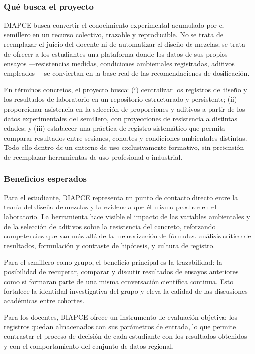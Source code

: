\subsubsection*{Qué busca el proyecto}

DIAPCE busca convertir el conocimiento experimental acumulado por el semillero en un recurso colectivo, trazable y reproducible. No se trata de reemplazar el juicio del docente ni de automatizar el diseño de mezclas; se trata de ofrecer a los estudiantes una plataforma donde los datos de sus propios ensayos ---resistencias medidas, condiciones ambientales registradas, aditivos empleados--- se conviertan en la base real de las recomendaciones de dosificación.

En términos concretos, el proyecto busca: (i) centralizar los registros de diseño y los resultados de laboratorio en un repositorio estructurado y persistente; (ii) proporcionar asistencia en la selección de proporciones y aditivos a partir de los datos experimentales del semillero, con proyecciones de resistencia a distintas edades; y (iii) establecer una práctica de registro sistemático que permita comparar resultados entre sesiones, cohortes y condiciones ambientales distintas. Todo ello dentro de un entorno de uso exclusivamente formativo, sin pretensión de reemplazar herramientas de uso profesional o industrial.

\subsubsection*{Beneficios esperados}

Para el estudiante, DIAPCE representa un punto de contacto directo entre la teoría del diseño de mezclas y la evidencia que él mismo produce en el laboratorio. La herramienta hace visible el impacto de las variables ambientales y de la selección de aditivos sobre la resistencia del concreto, reforzando competencias que van más allá de la memorización de fórmulas: análisis crítico de resultados, formulación y contraste de hipótesis, y cultura de registro.

Para el semillero como grupo, el beneficio principal es la trazabilidad: la posibilidad de recuperar, comparar y discutir resultados de ensayos anteriores como si formaran parte de una misma conversación científica continua. Esto fortalece la identidad investigativa del grupo y eleva la calidad de las discusiones académicas entre cohortes.

Para los docentes, DIAPCE ofrece un instrumento de evaluación objetiva: los registros quedan almacenados con sus parámetros de entrada, lo que permite contrastar el proceso de decisión de cada estudiante con los resultados obtenidos y con el comportamiento del conjunto de datos regional.

